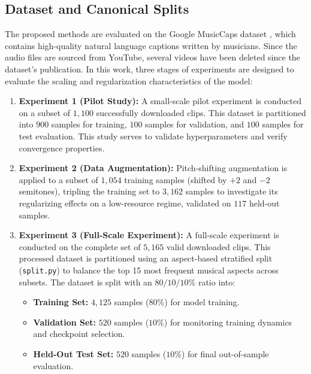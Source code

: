\documentclass[12pt, conference, letterpaper]{IEEEtran}
\begin{document}
\subsection{Dataset and Canonical Splits}
The proposed methods are evaluated on the Google MusicCaps dataset \cite{musiccaps}, which contains high-quality natural language captions written by musicians. Since the audio files are sourced from YouTube, several videos have been deleted since the dataset's publication. In this work, three stages of experiments are designed to evaluate the scaling and regularization characteristics of the model:
\begin{enumerate}
    \item \textbf{Experiment 1 (Pilot Study):} A small-scale pilot experiment is conducted on a subset of $1,100$ successfully downloaded clips. This dataset is partitioned into $900$ samples for training, $100$ samples for validation, and $100$ samples for test evaluation. This study serves to validate hyperparameters and verify convergence properties.
    \item \textbf{Experiment 2 (Data Augmentation):} Pitch-shifting augmentation is applied to a subset of $1,054$ training samples (shifted by $+2$ and $-2$ semitones), tripling the training set to $3,162$ samples to investigate its regularizing effects on a low-resource regime, validated on $117$ held-out samples.
    \item \textbf{Experiment 3 (Full-Scale Experiment):} A full-scale experiment is conducted on the complete set of $5,165$ valid downloaded clips. This processed dataset is partitioned using an aspect-based stratified split (\texttt{split.py}) to balance the top 15 most frequent musical aspects across subsets. The dataset is split with an $80/10/10\%$ ratio into:
          \begin{itemize}
              \item \textbf{Training Set:} $4,125$ samples ($80\%$) for model training.
              \item \textbf{Validation Set:} $520$ samples ($10\%$) for monitoring training dynamics and checkpoint selection.
              \item \textbf{Held-Out Test Set:} $520$ samples ($10\%$) for final out-of-sample evaluation.
          \end{itemize}
\end{enumerate}
\end{document}
